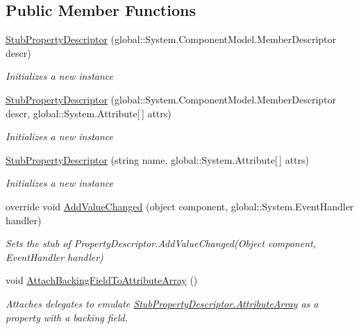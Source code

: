 \subsection*{Public Member Functions}
\begin{DoxyCompactItemize}
\item 
\hyperlink{class_system_1_1_component_model_1_1_fakes_1_1_stub_property_descriptor_a7328aed2b9a62eb84dd6d1dc62d2a290}{Stub\-Property\-Descriptor} (global\-::\-System.\-Component\-Model.\-Member\-Descriptor descr)
\begin{DoxyCompactList}\small\item\em Initializes a new instance\end{DoxyCompactList}\item 
\hyperlink{class_system_1_1_component_model_1_1_fakes_1_1_stub_property_descriptor_a0a963f519ec60b48159bb758b688af61}{Stub\-Property\-Descriptor} (global\-::\-System.\-Component\-Model.\-Member\-Descriptor descr, global\-::\-System.\-Attribute\mbox{[}$\,$\mbox{]} attrs)
\begin{DoxyCompactList}\small\item\em Initializes a new instance\end{DoxyCompactList}\item 
\hyperlink{class_system_1_1_component_model_1_1_fakes_1_1_stub_property_descriptor_a223e9066003e43ed3e6480fb4e83fb83}{Stub\-Property\-Descriptor} (string name, global\-::\-System.\-Attribute\mbox{[}$\,$\mbox{]} attrs)
\begin{DoxyCompactList}\small\item\em Initializes a new instance\end{DoxyCompactList}\item 
override void \hyperlink{class_system_1_1_component_model_1_1_fakes_1_1_stub_property_descriptor_a7fefe42982e69eda79dc0d7d95a909a6}{Add\-Value\-Changed} (object component, global\-::\-System.\-Event\-Handler handler)
\begin{DoxyCompactList}\small\item\em Sets the stub of Property\-Descriptor.\-Add\-Value\-Changed(\-Object component, Event\-Handler handler)\end{DoxyCompactList}\item 
void \hyperlink{class_system_1_1_component_model_1_1_fakes_1_1_stub_property_descriptor_a95331014b3da1465aaa83db70ab66bc6}{Attach\-Backing\-Field\-To\-Attribute\-Array} ()
\begin{DoxyCompactList}\small\item\em Attaches delegates to emulate \hyperlink{class_system_1_1_component_model_1_1_fakes_1_1_stub_property_descriptor_affe1c4f1b4240efd9e5ba8fbd65c3b4c}{Stub\-Property\-Descriptor.\-Attribute\-Array} as a property with a backing field.\end{DoxyCompactList}\item 

\end{DoxyCompactItemize}

